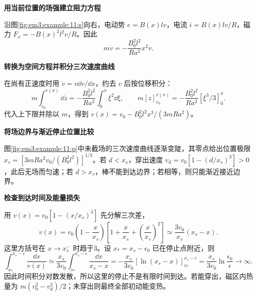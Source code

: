\begin{solution}\textbf{用当前位置的场强建立阻力方程}\par\nobreak
沿图\ref{fig:em3:example:11:s}向右，电动势 $e=B(x)lv$，电流 $i=B(x)lv/R$，磁力 $F_x=-B(x)^2l^2v/R$。因此
\[m\dot v=-\frac{B_0^2l^2}{Ra^2}x^2v.\]


\par\medskip{}\noindent\textbf{转换为空间方程并积分三次速度曲线}\par\nobreak
在尚有正速度时用 $\dot v=v\dd v/\dd x$，约去 $v$ 后按位移积分：
\[
 m\int_{v_0}^{v(x)}\dd z=-\frac{B_0^2l^2}{Ra^2}\int_0^x\xi^2\dd\xi,
 \qquad m[z]_{v_0}^{v(x)}=-\frac{B_0^2l^2}{Ra^2}[\xi^3/3]_0^x.
\]
代入上下限并除以 $m$，得到 $v(x)=v_0-B_0^2l^2x^3/(3mRa^2)$。



\par\medskip{}\noindent\textbf{将场边界与渐近停止位置比较}\par\nobreak
图\ref{fig:em3:example:11:p}中未截场的三次速度曲线逐渐变陡，其零点给出位置极限 $x_s=[3mRa^2v_0/(B_0^2l^2)]^{1/3}$。若 $d<x_s$，穿出速度 $v_d=v_0[1-(d/x_s)^3]>0$，此后无场而匀速；若 $d>x_s$，棒不能到达边界；若相等，则只能渐近接近边界。



\par\medskip{}\noindent\textbf{检查到达时间及能量损失}\par\nobreak
用 $v(x)=v_0[1-(x/x_s)^3]$ 先分解三次差，
\[
 v(x)=v_0\left(1-\frac x{x_s}\right)
 \left[1+\frac x{x_s}+\left(\frac x{x_s}\right)^2\right]
 \simeq\frac{3v_0}{x_s}(x_s-x).
\]
这里方括号在 $x\to x_s^-$ 时趋于3。设 $x_*=x_s-\epsilon_0$ 已在停止点附近，则
\[
\int_{x_*}^{x_s-\epsilon}\frac{\dd x}{v(x)}
\simeq\frac{x_s}{3v_0}
\int_{x_*}^{x_s-\epsilon}\frac{\dd x}{x_s-x}
 =-\frac{x_s}{3v_0}[\ln(x_s-x)]_{x_*}^{x_s-\epsilon}
 =\frac{x_s}{3v_0}\ln\frac{\epsilon_0}{\epsilon}
\longrightarrow\infty.
\]
因此时间积分对数发散，所以这里的停止不是有限时间到达。若能穿出，磁区内热量为 $m(v_0^2-v_d^2)/2$；未穿出则最终全部初动能变热。\end{solution}
